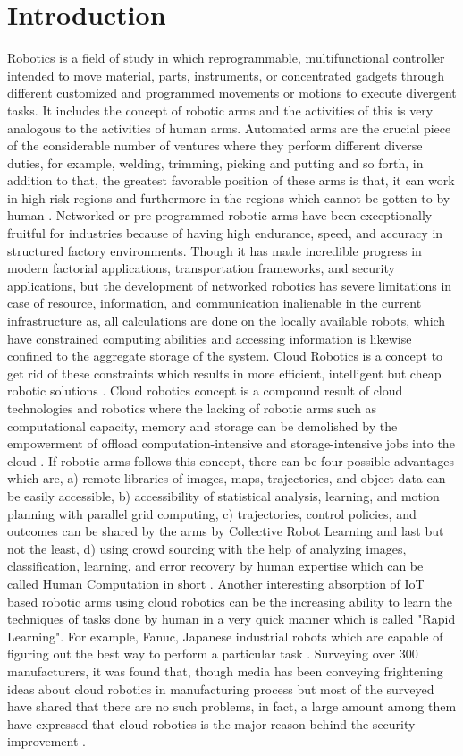 \documentclass[conference]{IEEEtran}
\begin{document}
\section{Introduction}
Robotics is a field of study in which reprogrammable, multifunctional controller intended to move material, parts, instruments, or concentrated gadgets through different customized and programmed movements or motions to execute divergent tasks. It includes the concept of robotic arms and the activities of this is very analogous to the activities of human arms. Automated arms are the crucial piece of the considerable number of ventures where they perform different diverse duties, for example, welding, trimming, picking and putting and so forth, in addition to that, the greatest favorable position of these arms is that, it can work in high-risk regions and furthermore in the regions which cannot be gotten to by human \cite{one}. Networked or pre-programmed robotic arms have been exceptionally fruitful for industries because of having high endurance, speed, and accuracy in structured factory environments. Though it has made incredible progress in modern factorial applications, transportation frameworks, and security applications, but the development of networked robotics has severe limitations in case of resource, information, and communication inalienable in the current infrastructure as, all calculations are done on the locally available robots, which have constrained computing abilities and accessing information is likewise confined to the aggregate storage of the system. Cloud Robotics is a concept to get rid of these constraints which results in more efficient, intelligent but cheap robotic solutions \cite{two}.
Cloud robotics concept is a compound result of cloud technologies and robotics where the lacking of robotic arms such as computational capacity, memory and storage can be demolished by the empowerment of offload computation-intensive and storage-intensive jobs into the cloud \cite{four}. If robotic arms follows this concept, there can be four possible advantages which are, a) remote libraries of images, maps, trajectories, and object data can be easily accessible, b) accessibility of statistical analysis, learning, and motion planning with parallel grid computing, c) trajectories, control policies, and outcomes can be shared by the arms by Collective Robot Learning and last but not the least, d) using crowd sourcing with the help of analyzing images, classification, learning, and error recovery by human expertise which can be called Human Computation in short \cite{four}. Another interesting absorption of IoT based robotic arms using cloud robotics can be the increasing ability to learn the techniques of tasks done by human in a very quick manner which is called "Rapid Learning". For example, Fanuc, Japanese industrial robots which are capable of figuring out the best way to perform a particular task \cite{five}. Surveying over 300 manufacturers, it was found that, though media has been conveying frightening ideas about cloud robotics in manufacturing process but most of the surveyed have shared that there are no such problems, in fact, a large amount among them have expressed that cloud robotics is the major reason behind the security improvement \cite{six}.
\end{document}

